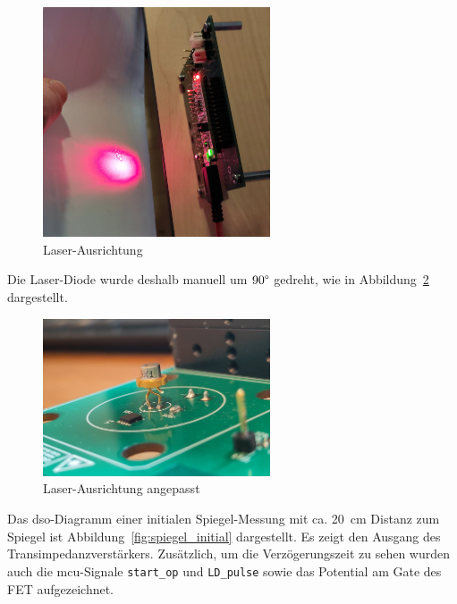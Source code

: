 \begin{figure}[H]
    \centering
    \includegraphics[width=0.6\textwidth]{graphics/laser_ausrichtung.jpg}
    \caption{Laser-Ausrichtung}\label{fig:laser_ausrichtung}
\end{figure}

Die Laser-Diode wurde deshalb manuell um $90\degree$ gedreht, wie in Abbildung~\ref{fig:laser_ausrichtung_angepasst}
dargestellt.

\begin{figure}[H]
    \centering
    \includegraphics[width=0.6\textwidth]{graphics/laser_ausrichtung_angepasst.jpg}
    \caption{Laser-Ausrichtung angepasst}\label{fig:laser_ausrichtung_angepasst}
\end{figure}

Das \acrshort{dso}-Diagramm einer initialen Spiegel-Messung mit ca. 20~cm Distanz zum Spiegel ist
Abbildung~\ref{fig:spiegel_initial} dargestellt. Es zeigt den Ausgang des Transimpedanzverstärkers. Zusätzlich, um die
Verzögerungszeit zu sehen wurden auch die \acrshort{mcu}-Signale \lstinline|start_op| und \lstinline|LD_pulse| sowie das
Potential am Gate des FET aufgezeichnet.


